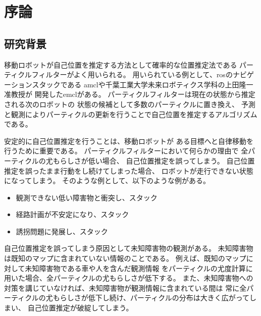 \chapter{序論}

\section{研究背景}

移動ロボットが自己位置を推定する方法として確率的な位置推定法である
パーティクルフィルターがよく用いられる。
用いられている例として、rosのナビゲーションスタックである
amcl\cite{amcl_github}や千葉工業大学未来ロボティクス学科の上田隆一准教授が
開発したemcl\cite{emcl_github}がある。
パーティクルフィルターは現在の状態から推定される次のロボットの
状態の候補として多数のパーティクルに置き換え、
予測と観測によりパーティクルの更新を行うことで自己位置を推定するアルゴリズムである。

安定的に自己位置推定を行うことは、移動ロボットが
ある目標へと自律移動を行うために重要である。
パーティクルフィルターにおいて何らかの理由で
全パーティクルの尤もらしさが低い場合、
自己位置推定を誤ってしまう。
自己位置推定を誤ったまま行動をし続けてしまった場合、
ロボットが走行できない状態になってしまう。
そのような例として、以下のような例がある。

\begin{itemize}
  \item 観測できない低い障害物と衝突し、スタック
  \item 経路計画が不安定になり、スタック
  \item 誘拐問題\cite{gutmann2002etal}に発展し、スタック
\end{itemize}

自己位置推定を誤ってしまう原因として未知障害物の観測がある。
未知障害物は既知のマップに含まれていない情報のことである。
例えば、既知のマップに対して未知障害物である車や人を含んだ観測情報
をパーティクルの尤度計算に用いた場合、全パーティクルの尤もらしさが低下する。
また、未知障害物への対策を講じていなければ、未知障害物が観測情報に含まれている間は
常に全パーティクルの尤もらしさが低下し続け、パーティクルの分布は大きく広がってしまい、
自己位置推定が破綻してしまう。

